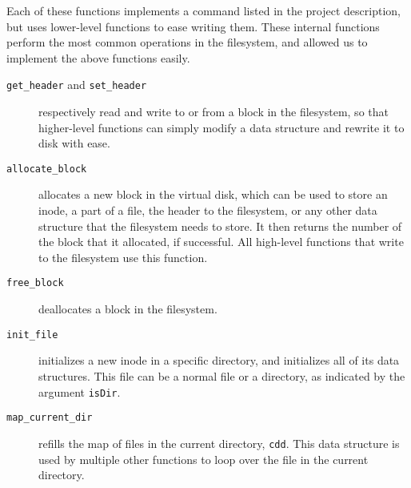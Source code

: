 \documentclass[twoside]{article}
\begin{document}
\begin{multicols}{2}
Each of these functions implements a command listed in the project description,
but uses lower-level functions to ease writing them. These internal functions
perform the most common operations in the filesystem, and allowed us to
implement the above functions easily.

\begin{description}
  \item[\texttt{get\_header} and \texttt{set\_header}] respectively read and
    write to or from a block in the filesystem, so that higher-level functions
    can simply modify a data structure and rewrite it to disk with ease.
  \item[\texttt{allocate\_block}] allocates a new block in the virtual disk,
    which can be used to store an inode, a part of a file, the header to the
    filesystem, or any other data structure that the filesystem needs to store.
    It then returns the number of the block that it allocated, if successful.
    All high-level functions that write to the filesystem use this function.
  \item[\texttt{free\_block}] deallocates a block in the filesystem.
  \item[\texttt{init\_file}] initializes a new inode in a specific directory,
    and initializes all of its data structures. This file can be a normal file
    or a directory, as indicated by the argument \texttt{isDir}.
  \item[\texttt{map\_current\_dir}] refills the map of files in the current
    directory, \texttt{cdd}. This data structure is used by multiple other
    functions to loop over the file in the current directory.
\end{description}


\end{multicols}
\end{document}
